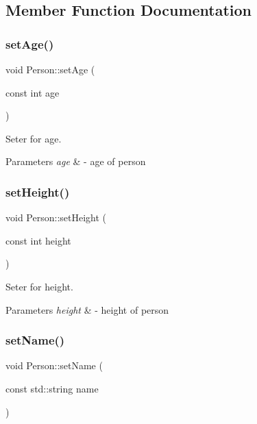 \subsection{Member Function Documentation}
\mbox{\label{classPerson_a82373821fca84791619839131cfd2706}} 
\subsubsection{\texorpdfstring{set\+Age()}{setAge()}}
{\footnotesize\ttfamily void Person\+::set\+Age (\begin{DoxyParamCaption}\item[{const int}]{age }\end{DoxyParamCaption})}



Seter for age. 


\begin{DoxyParams}{Parameters}
{\em age} & -\/ age of person \\
\hline
\end{DoxyParams}
\mbox{\label{classPerson_ad01c1735b506b0690f1d179d548b5fab}} 
\subsubsection{\texorpdfstring{set\+Height()}{setHeight()}}
{\footnotesize\ttfamily void Person\+::set\+Height (\begin{DoxyParamCaption}\item[{const int}]{height }\end{DoxyParamCaption})}



Seter for height. 


\begin{DoxyParams}{Parameters}
{\em height} & -\/ height of person \\
\hline
\end{DoxyParams}
\mbox{\label{classPerson_ab66200779d1edff08f2dfd58b971ebf7}} 
\subsubsection{\texorpdfstring{set\+Name()}{setName()}}
{\footnotesize\ttfamily void Person\+::set\+Name (\begin{DoxyParamCaption}\item[{const std\+::string}]{name }\end{DoxyParamCaption})}



